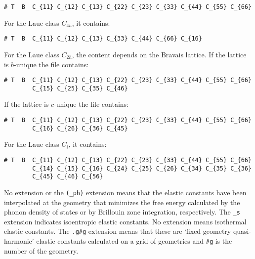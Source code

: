 \documentclass[12pt,a4paper]{article}
\begin{document}
\begin{itemize}
\begin{verbatim}
# T  B  C_{11} C_{12} C_{13} C_{22} C_{23} C_{33} C_{44} C_{55} C_{66}
\end{verbatim}
For the Laue class $C_{4h}$, it contains:
\begin{verbatim}
# T  B  C_{11} C_{12} C_{13} C_{33} C_{44} C_{66} C_{16}  
\end{verbatim}
For the Laue class $C_{2h}$, the content depends on the Bravais lattice. 
If the lattice is $b$-unique the file contains:
\begin{verbatim}
# T  B  C_{11} C_{12} C_{13} C_{22} C_{23} C_{33} C_{44} C_{55} C_{66} 
        C_{15} C_{25} C_{35} C_{46} 
\end{verbatim}
If the lattice is $c$-unique the file contains:
\begin{verbatim}
# T  B  C_{11} C_{12} C_{13} C_{22} C_{23} C_{33} C_{44} C_{55} C_{66} 
        C_{16} C_{26} C_{36} C_{45} 
\end{verbatim}
For the Laue class $C_i$, it contains:
\begin{verbatim}
# T  B  C_{11} C_{12} C_{13} C_{22} C_{23} C_{33} C_{44} C_{55} C_{66} 
        C_{14} C_{15} C_{16} C_{24} C_{25} C_{26} C_{34} C_{35} C_{36}
        C_{45} C_{46} C_{56} 
\end{verbatim}
No extension or the \texttt{(\_ph)} extension means that the elastic
constants have been interpolated at the geometry that minimizes the
free energy calculated by the phonon density of states or by Brillouin
zone integration, respectively. 
The \texttt{\_s} extension indicates isoentropic elastic constants.
No extension means isothermal elastic constants.
The \texttt{.g\#g} extension means that these are `fixed geometry
quasi-harmonic' elastic constants calculated on a grid of geometries
and \texttt{\#g} is the number of the geometry.


\end{itemize}
\end{document}
